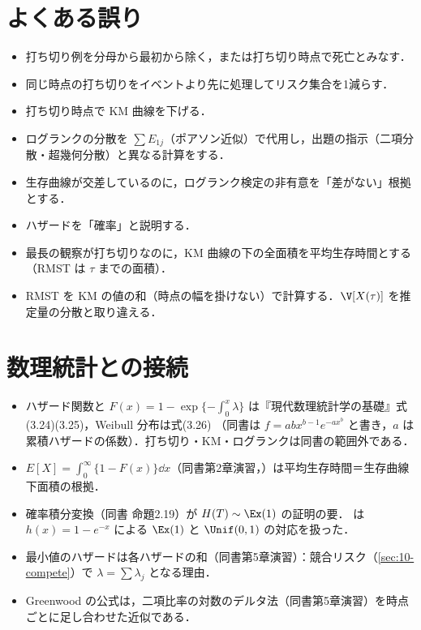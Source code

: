 \section{よくある誤り}\label{sec:09-err}
\begin{warnbox}
\begin{itemize}
\item 打ち切り例を分母から最初から除く，または打ち切り時点で死亡とみなす．
\item 同じ時点の打ち切りをイベントより先に処理してリスク集合を1減らす．
\item 打ち切り時点で KM 曲線を下げる．
\item ログランクの分散を $\sum E_{1j}$（ポアソン近似）で代用し，出題の指示（二項分散・超幾何分散）と異なる計算をする．
\item 生存曲線が交差しているのに，ログランク検定の非有意を「差がない」根拠とする．
\item ハザードを「確率」と説明する．
\item 最長の観察が打ち切りなのに，KM 曲線の下の全面積を平均生存時間とする（RMST は $\tau$ までの面積）．
\item RMST を KM の値の和（時点の幅を掛けない）で計算する．$\V[X(\tau)]$ を推定量の分散と取り違える．
\end{itemize}
\end{warnbox}

\section{数理統計との接続}\label{sec:09-link}
\begin{linkbox}
\begin{itemize}
\item ハザード関数と $F(x)=1-\exp\{-\int_0^x\lambda\}$ は『現代数理統計学の基礎』式(3.24)(3.25)，Weibull 分布は式(3.26)
      （同書は $f=abx^{b-1}e^{-ax^b}$ と書き，$a$ は累積ハザードの係数）．打ち切り・KM・ログランクは同書の範囲外である．
\item $E[X]=\int_0^\infty\{1-F(x)\}\dd x$（同書第2章演習，）は平均生存時間＝生存曲線下面積の根拠．
\item 確率積分変換（同書 命題2.19）が $H(T)\sim\Ex(1)$ の証明の要． は $h(x)=1-e^{-x}$ による $\Ex(1)$ と $\Unif(0,1)$ の対応を扱った．
\item 最小値のハザードは各ハザードの和（同書第5章演習）：競合リスク（\cref{sec:10-compete}）で $\lambda=\sum\lambda_j$ となる理由．
\item Greenwood の公式は，二項比率の対数のデルタ法（同書第5章演習）を時点ごとに足し合わせた近似である．
\end{itemize}
\end{linkbox}

